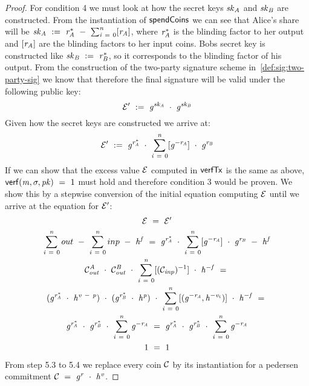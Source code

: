 \begin{proof}
    For condition 4 we must look at how the secret keys $\mathit{sk}_{\mathit{A}}$ and $\mathit{sk}_{\mathit{B}}$ are constructed.
    From the instantiation of $\mathsf{spendCoins}$ we can see that Alice's share will be $\mathit{sk}_{\mathit{A}} ~:=~ \mathit{r}_{\mathit{A}}^* ~-~ \sum_{\mathit{i} ~=~ 0}^{\mathit{n}} [\mathit{r}_{\mathit{A}}]$, where $\mathit{r}_{\mathit{A}}^*$ is the blinding factor to her output and $[\mathit{r}_{\mathit{A}}]$ are the blinding factors to her input coins.
    Bobs secret key is constructed like $\mathit{sk}_{\mathit{B}} ~:=~ \mathit{r}_{\mathit{B}}^*$, so it corresponds to the blinding factor of his output.
    From the construction of the two-party signature scheme in~\cref{def:sig:two-party-sig} we know that therefore the final signature will be valid under the following public key:
    \[ {\mathcal{E}}' ~:=~ \mathit{g}^{\mathit{sk}_{\mathit{A}}} ~\cdot~ \mathit{g}^{\mathit{sk}_{\mathit{B}}} \]
    Given how the secret keys are constructed we arrive at:
    \[ {\mathcal{E}}' ~:=~ \mathit{g}^{\mathit{r}_{\mathit{A}}^*} ~\cdot~ \sum_{\mathit{i} ~=~ 0}^{\mathit{n}} [\mathit{g}^{- \mathit{r}_{\mathit{A}}}] ~\cdot~ \mathit{g}^{\mathit{r}_{\mathit{B}}} \]
    If we can show that the excess value $\mathcal{E}$ computed in $\mathsf{verfTx}$ is the same as above, $\mathsf{verf}(\mathit{m}, \sigma, \mathit{pk}) ~=~ 1$ must hold and therefore condition 3 would be proven.
    We show this by a stepwise conversion of the initial equation computing $\mathcal{E}$ until we arrive at the equation for ${\mathcal{E}}'$:
    \begin{gather}
        \mathcal{E} ~=~ {\mathcal{E}}' \\
        \sum_{\mathit{i} ~=~ 0}^{\mathit{n}} out ~-~ \sum_{\mathit{i} ~=~ 0}^{\mathit{n}} inp ~-~ \mathit{h}^{\mathit{f}}  ~=~ \mathit{g}^{\mathit{r}_{\mathit{A}}^*} ~\cdot~ \sum_{\mathit{i} ~=~ 0}^{\mathit{n}} [\mathit{g}^{- \mathit{r}_{\mathit{A}}}] ~\cdot~ \mathit{g}^{\mathit{r}_{\mathit{B}}} ~-~ \mathit{h}^{\mathit{f}} \\
        \mathcal{C}_{\mathit{out}}^{\mathit{A}} ~\cdot~ \mathcal{C}_{\mathit{out}}^{\mathit{B}} ~\cdot~ \sum_{\mathit{i} ~=~ 0}^{\mathit{n}} [(\mathcal{C}_{\mathit{inp}})^{-1}] ~\cdot~ \mathit{h}^{- \mathit{f}}  ~=~\\
        (\mathit{g}^{\mathit{r}_{\mathit{A}}^*} ~\cdot~ \mathit{h}^{\mathit{v} ~-~ \mathit{p}}) ~\cdot~
        (\mathit{g}^{\mathit{r}_{\mathit{B}}^*} ~\cdot~ \mathit{h}^{\mathit{p}}) ~\cdot~
        \sum_{\mathit{i} ~=~ 0}^{\mathit{n}} [(\mathit{g}^{- \mathit{r}_{\mathit{A}}}, \mathit{h}^{- \mathit{v}_i})] ~\cdot~ \mathit{h}^{- \mathit{f}} ~=~ \\
        \mathit{g}^{\mathit{r}_{\mathit{A}}^*} ~\cdot~ \mathit{g}^{\mathit{r}_{\mathit{B}}^*} ~\cdot~ \sum_{\mathit{i} ~=~ 0}^{\mathit{n}} \mathit{g}^{- \mathit{r}_{\mathit{A}}} ~=~ \mathit{g}^{\mathit{r}_{\mathit{A}}^*} ~\cdot~ \mathit{g}^{\mathit{r}_{\mathit{B}}^*} ~\cdot~ \sum_{\mathit{i} ~=~ 0}^{\mathit{n}} \mathit{g}^{- \mathit{r}_{\mathit{A}}} \\
        1 ~=~ 1
    \end{gather}
    From step 5.3 to 5.4 we replace every coin $\mathcal{C}$ by its instantiation for a pedersen commitment $\mathcal{C} ~=~ \mathit{g}^{\mathit{r}} ~\cdot~ \mathit{h}^{\mathit{v}}$.


\end{proof}
